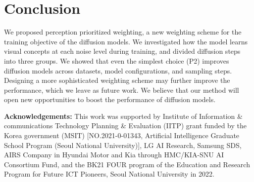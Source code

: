 \section{Conclusion}
\label{sec:conclusion}
We proposed perception prioritized weighting, a new weighting scheme for the training objective of the diffusion models. We investigated how the model learns visual concepts at each noise level during training, and divided diffusion steps into three groups. %
We showed that even the simplest choice (P2) improves diffusion models across datasets, model configurations, and sampling steps. 
Designing a more sophisticated weighting scheme may further improve the performance, which we leave as future work. We believe that our method will open new opportunities to boost the performance of diffusion models. %

\vspace{1em}
\textbf{Acknowledgements:} This work was supported by Institute of Information \& communications Technology Planning \& Evaluation (IITP) grant funded by the Korea government (MSIT) [NO.2021-0-01343, Artificial Intelligence Graduate School Program (Seoul National University)], LG AI Research, Samsung SDS, AIRS Company in Hyundai Motor and Kia through HMC/KIA-SNU AI Consortium Fund, and the BK21 FOUR program of the Education and Research Program for Future ICT Pioneers, Seoul National University in 2022.